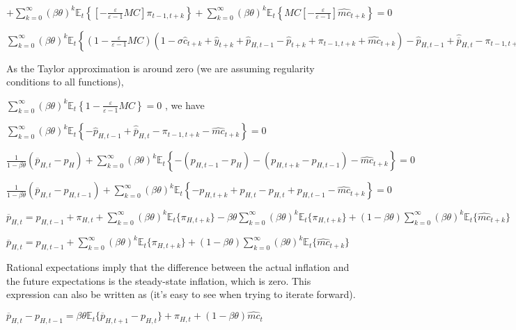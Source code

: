 \documentclass[
]{article}
\begin{document}
\(\displaystyle + \sum_{k=0}^\infty (\beta \theta)^k\mathbb{E}_t \left\{ \left[ -\frac{\varepsilon}{\varepsilon-1} MC \right]\pi_{t-1,t+k} \right\} + \sum_{k=0}^\infty (\beta \theta)^k\mathbb{E}_t \left\{ MC \left[ -\frac{\varepsilon}{\varepsilon-1} \right]\widehat{mc}_{t+k} \right\}=0\)

\(\displaystyle \sum_{k=0}^\infty (\beta \theta)^k\mathbb{E}_t \left\{ \left(1-\frac{\varepsilon}{\varepsilon-1} MC \right)(1-\sigma \hat{c}_{t+k} + \hat{y}_{t+k} + \hat{p}_{H,t-1} -\hat{p}_{t+k} + \pi_{t-1,t+k} + \widehat{mc}_{t+k}) -\hat{p}_{H,t-1} +\hat{\overline{p}}_{H,t}-\pi_{t-1,t+k} - \widehat{mc}_{t+k} \right\}\)

As the Taylor approximation is around zero (we are assuming regularity
conditions to all functions),

\(\displaystyle \sum_{k=0}^\infty (\beta \theta)^k\mathbb{E}_t \left\{ 1-\frac{\varepsilon}{\varepsilon-1} MC \right\}=0\)
, we have

\(\displaystyle \sum_{k=0}^\infty (\beta \theta)^k\mathbb{E}_t \left\{ -\hat{p}_{H,t-1} +\hat{\overline{p}}_{H,t}-\pi_{t-1,t+k} - \widehat{mc}_{t+k} \right\}=0\)

\(\displaystyle \frac{1}{1-\beta \theta}(\overline{p}_{H,t}-p_{H}) + \sum_{k=0}^\infty (\beta \theta)^k\mathbb{E}_t \left\{ -(p_{H,t-1}-p_{H}) -(p_{H,t+k}-p_{H,t-1}) - \widehat{mc}_{t+k} \right\}=0\)

\(\displaystyle \frac{1}{1-\beta \theta}(\overline{p}_{H,t}-p_{H,t-1}) + \sum_{k=0}^\infty (\beta \theta)^k\mathbb{E}_t \left\{ -p_{H,t+k}+p_{H,t}-p_{H,t}+p_{H,t-1} - \widehat{mc}_{t+k} \right\}=0\)

\(\displaystyle \overline{p}_{H,t} = p_{H,t-1} + \pi_{H,t}+ \sum_{k=0}^\infty (\beta \theta)^k \mathbb{E}_t \{\pi_{H,t+k} \} -\beta \theta\sum_{k=0}^\infty (\beta \theta)^k \mathbb{E}_t \{\pi_{H,t+k} \} + (1-\beta \theta)\sum_{k=0}^\infty (\beta \theta)^k \mathbb{E}_t \{\widehat{mc}_{t+k} \}\)

\(\displaystyle \overline{p}_{H,t} = p_{H,t-1} + \sum_{k=0}^\infty (\beta \theta)^k \mathbb{E}_t \{\pi_{H,t+k} \} + (1-\beta \theta)\sum_{k=0}^\infty (\beta \theta)^k \mathbb{E}_t \{\widehat{mc}_{t+k} \}\)

Rational expectations imply that the difference between the actual
inflation and the future expectations is the steady-state inflation,
which is zero. This expression can also be written as (it's easy to see
when trying to iterate forward).

\(\overline{p}_{H,t}-p_{H,t-1}=\beta \theta \mathbb{E}_t \{ \overline{p}_{H,t+1}-p_{H,t}\} + \pi_{H,t}+(1-\beta \theta)\widehat{mc}_t\)
\end{document}
